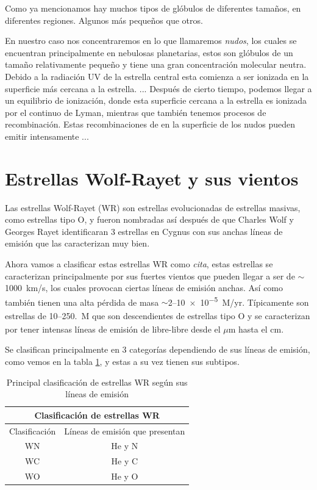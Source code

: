 \documentclass{book}
\begin{document}
Como ya mencionamos hay muchos tipos de glóbulos de diferentes tamaños, en diferentes regiones. Algunos más pequeños que otros. 

En nuestro caso nos concentraremos en lo que llamaremos \textit{nudos}, los cuales se encuentran principalmente en nebulosas planetarias, estos son glóbulos de un tamaño relativamente pequeño y tiene una gran concentración molecular neutra. Debido a la radiación UV de la estrella central esta comienza a ser ionizada en la superficie más cercana a la estrella. ...
Después de cierto tiempo, podemos llegar a un equilibrio de ionización, donde esta superficie cercana a la estrella es ionizada por el continuo de Lyman, mientras que también tenemos procesos de recombinación. Estas recombinaciones de en la superficie de los nudos pueden emitir intensamente ...

\section{Estrellas Wolf-Rayet y sus vientos}

Las estrellas Wolf-Rayet (WR) son estrellas evolucionadas de estrellas masivas, como estrellas tipo O, y fueron nombradas así después de que Charles Wolf y Georges Rayet identificaran 3 estrellas en Cygnus con sus  anchas líneas de emisión que las caracterizan muy bien. 

Ahora vamos a clasificar estas estrellas WR como \textit{cita}, estas estrellas se caracterizan principalmente por sus fuertes vientos que pueden llegar a ser de $\sim$\SI{1000}{km/s}, los cuales provocan ciertas líneas de emisión anchas. Así como también tienen una alta pérdida de masa $\sim$2--\SI{10e-5}{M_\odot/yr}. Típicamente son estrellas de 10--25\SI{.}{M_\odot} que son descendientes de estrellas tipo O y se caracterizan por tener intensas líneas de emisión de libre-libre desde el $\mu$m hasta el cm.

Se clasifican principalmente en 3 categorías dependiendo de sus líneas de emisión, como vemos en la tabla \ref{tab:WR-clasificacion}, y estas a su vez tienen sus subtipos.

\begin{table}[h]
    \begin{center}
        \begin{tabular}{|c|c|}
        \hline
        \multicolumn{2}{|c|}{Clasificación de estrellas WR} \\ \hline
        Clasificación    & Líneas de emisión que presentan\\ \hline
        WN     & He y N\\
        WC & He y C\\
        WO & He y O \\ \hline
        \end{tabular}
    \caption{Principal clasificación de estrellas WR  según sus líneas de emisión}
    \label{tab:WR-clasificacion}
    \end{center}
\end{table}
\end{document}
